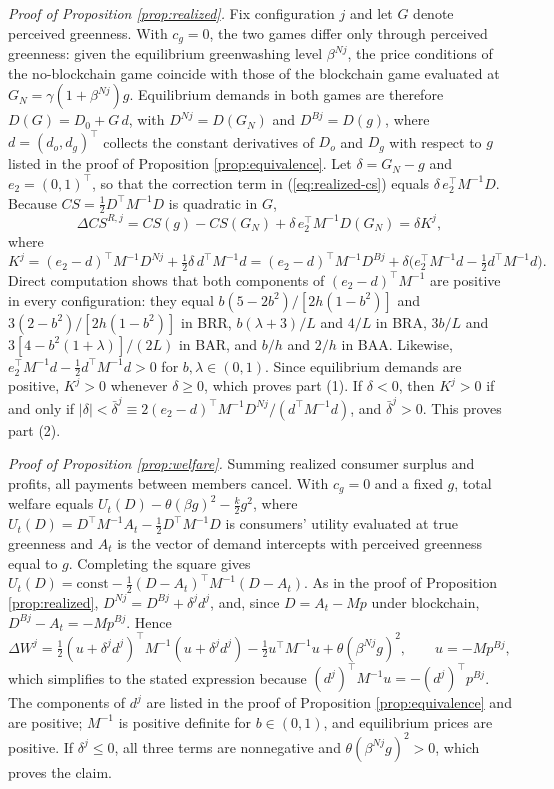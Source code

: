 \documentclass[preprint,review,12pt,authoryear,nopreprintline]{elsarticle}
\theoremstyle{definition}
\begin{document}
\noindent \textit{Proof of Proposition \ref{prop:realized}.}
Fix configuration $j$ and let $G$ denote perceived greenness. With $c_g=0$, the two games differ only through perceived greenness: given the equilibrium greenwashing level $\beta^{Nj}$, the price conditions of the no-blockchain game coincide with those of the blockchain game evaluated at $G_N=\gamma(1+\beta^{Nj})g$. Equilibrium demands in both games are therefore $D(G)=D_0+G\,d$, with $D^{Nj}=D(G_N)$ and $D^{Bj}=D(g)$, where $d=(d_o,d_g)^\top$ collects the constant derivatives of $D_o$ and $D_g$ with respect to $g$ listed in the proof of Proposition \ref{prop:equivalence}. Let $\delta=G_N-g$ and $e_2=(0,1)^\top$, so that the correction term in (\ref{eq:realized-cs}) equals $\delta\,e_2^\top M^{-1}D$. Because $CS=\frac12 D^\top M^{-1}D$ is quadratic in $G$,
\[
\Delta CS^{R,j}=CS(g)-CS(G_N)+\delta\,e_2^\top M^{-1}D(G_N)=\delta K^j,
\]
where
\[
K^j=(e_2-d)^\top M^{-1}D^{Nj}+\tfrac12\delta\,d^\top M^{-1}d=(e_2-d)^\top M^{-1}D^{Bj}+\delta\bigl(e_2^\top M^{-1}d-\tfrac12 d^\top M^{-1}d\bigr).
\]
Direct computation shows that both components of $(e_2-d)^\top M^{-1}$ are positive in every configuration: they equal $b(5-2b^2)/[2h(1-b^2)]$ and $3(2-b^2)/[2h(1-b^2)]$ in BRR, $b(\lambda+3)/L$ and $4/L$ in BRA, $3b/L$ and $3[4-b^2(1+\lambda)]/(2L)$ in BAR, and $b/h$ and $2/h$ in BAA. Likewise, $e_2^\top M^{-1}d-\frac12 d^\top M^{-1}d>0$ for $b,\lambda\in(0,1)$. Since equilibrium demands are positive, $K^j>0$ whenever $\delta\geq0$, which proves part (1). If $\delta<0$, then $K^j>0$ if and only if $|\delta|<\bar{\delta}^j\equiv2(e_2-d)^\top M^{-1}D^{Nj}/(d^\top M^{-1}d)$, and $\bar{\delta}^j>0$. This proves part (2).

\noindent \textit{Proof of Proposition \ref{prop:welfare}.}
Summing realized consumer surplus and profits, all payments between members cancel. With $c_g=0$ and a fixed $g$, total welfare equals $U_t(D)-\theta(\beta g)^2-\frac{k}{2}g^2$, where $U_t(D)=D^\top M^{-1}A_t-\frac12D^\top M^{-1}D$ is consumers' utility evaluated at true greenness and $A_t$ is the vector of demand intercepts with perceived greenness equal to $g$. Completing the square gives $U_t(D)=\mathrm{const}-\frac12(D-A_t)^\top M^{-1}(D-A_t)$. As in the proof of Proposition \ref{prop:realized}, $D^{Nj}=D^{Bj}+\delta^j d^j$, and, since $D=A_t-Mp$ under blockchain, $D^{Bj}-A_t=-Mp^{Bj}$. Hence
\[
\Delta W^j=\tfrac12(u+\delta^j d^j)^\top M^{-1}(u+\delta^j d^j)-\tfrac12u^\top M^{-1}u+\theta(\beta^{Nj}g)^2,\qquad u=-Mp^{Bj},
\]
which simplifies to the stated expression because $(d^j)^\top M^{-1}u=-(d^j)^\top p^{Bj}$. The components of $d^j$ are listed in the proof of Proposition \ref{prop:equivalence} and are positive; $M^{-1}$ is positive definite for $b\in(0,1)$, and equilibrium prices are positive. If $\delta^j\leq0$, all three terms are nonnegative and $\theta(\beta^{Nj}g)^2>0$, which proves the claim.
\end{document}
